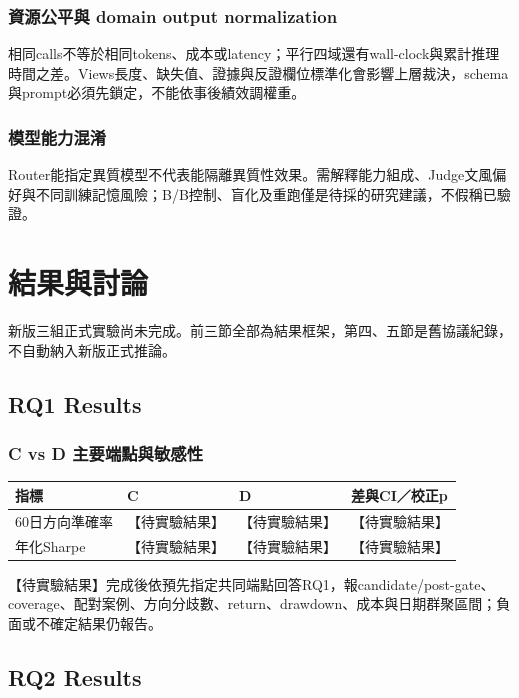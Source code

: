 \documentclass[12pt,a4paper]{article}
\begin{document}
\begin{CJK}{UTF8}{bkai}
\subsubsection{資源公平與 domain output normalization}
相同calls不等於相同tokens、成本或latency；平行四域還有wall-clock與累計推理時間之差。Views長度、缺失值、證據與反證欄位標準化會影響上層裁決，schema與prompt必須先鎖定，不能依事後績效調權重。

\subsubsection{模型能力混淆}
Router能指定異質模型不代表能隔離異質性效果。需解釋能力組成、Judge文風偏好與不同訓練記憶風險；B/B控制、盲化及重跑僅是待採的研究建議，不假稱已驗證。

\section{結果與討論}
新版三組正式實驗尚未完成。前三節全部為結果框架，第四、五節是舊協議紀錄，不自動納入新版正式推論。

\subsection{RQ1 Results}

\subsubsection{C vs D 主要端點與敏感性}
\begin{table}[H]\centering\small
\begin{tabularx}{\textwidth}{@{}lYYY@{}}\toprule
指標 & C & D & 差與CI／校正p\\
\midrule
60日方向準確率 & 【待實驗結果】 & 【待實驗結果】 & 【待實驗結果】\\
年化Sharpe & 【待實驗結果】 & 【待實驗結果】 & 【待實驗結果】\\\bottomrule\end{tabularx}\end{table}
【待實驗結果】完成後依預先指定共同端點回答RQ1，報candidate/post-gate、coverage、配對案例、方向分歧數、return、drawdown、成本與日期群聚區間；負面或不確定結果仍報告。

\subsection{RQ2 Results}


\end{CJK}
\end{document}
